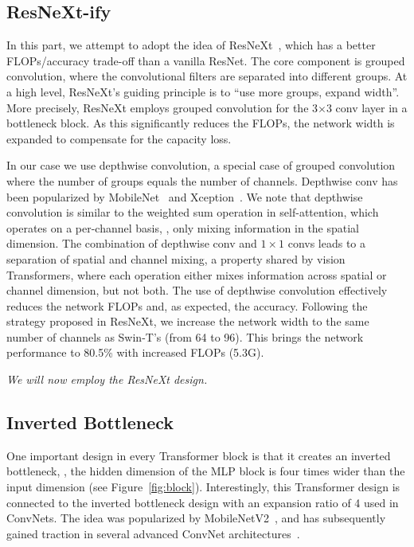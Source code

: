\documentclass[10pt,twocolumn,letterpaper]{article}
\begin{document}
\subsection{ResNeXt-ify}
\vspace{-0.2em} 
In this part, we attempt to adopt the idea of ResNeXt~\cite{Xie2017}, which has a better FLOPs/accuracy trade-off than a vanilla ResNet. The core component is grouped convolution, where the convolutional filters are separated into different groups. At a high level, ResNeXt's guiding principle is to ``use more groups, expand width''. More precisely, ResNeXt employs grouped convolution for the 3$\times$3 conv layer in a bottleneck block. As this significantly reduces the FLOPs, the network width is expanded to compensate for the capacity loss. 

In our case we use depthwise convolution, a special case of grouped convolution where the number of groups equals the number of channels. Depthwise conv has been popularized by MobileNet~\cite{Howard2017} and Xception~\cite{Chollet2017}. We note that depthwise convolution is similar to the weighted sum operation in self-attention, which operates on a per-channel basis, \ie, only mixing information in the spatial dimension. The combination of depthwise conv and $1\times1$ convs leads to a separation of spatial and channel mixing, a property shared by vision Transformers, where each operation either mixes information across spatial or channel dimension, but not both. The use of depthwise convolution effectively reduces the network FLOPs and, as expected, the accuracy. Following the strategy proposed in ResNeXt, we increase the network width to the same number of channels as Swin-T's (from 64 to 96). This brings the network performance to 80.5\% with increased FLOPs (5.3G).
  
\textit{We will now employ the ResNeXt design.}

\subsection{Inverted Bottleneck}
\vspace{-0.2em}
One important design in every Transformer block is that it creates an inverted bottleneck, \ie, the hidden dimension of the MLP block is four times wider than the input dimension (see Figure~\ref{fig:block}). Interestingly, this Transformer design is connected to the inverted bottleneck design with an expansion ratio of 4 used in ConvNets. The idea was popularized by MobileNetV2~\cite{Sandler2018}, and has subsequently gained traction in several advanced ConvNet architectures~\cite{Tan2019efficientnet,tan2019mnasnet}.
\end{document}
